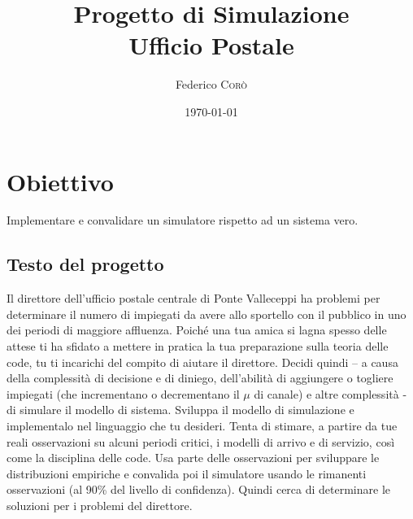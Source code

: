 \documentclass{article}
\title{Progetto di Simulazione \\ Ufficio Postale} %
\author{Federico \textsc{Corò}} %
\date{\today} %
\begin{document}
\maketitle %




\section{Obiettivo}

Implementare e convalidare un simulatore rispetto ad un sistema vero.

\subsection{Testo del progetto}
\label{definitions}
Il direttore dell’ufficio postale centrale di Ponte Valleceppi ha problemi per determinare il numero
di impiegati da avere allo sportello con il pubblico in uno dei periodi di maggiore affluenza.
Poiché una tua amica si lagna spesso delle attese ti ha sfidato a mettere in pratica la tua
preparazione sulla teoria delle code, tu ti incarichi del compito di aiutare il direttore.
Decidi quindi – a causa della complessità di decisione e di diniego, dell’abilità di aggiungere o
togliere impiegati (che incrementano o decrementano il $\mu$ di canale) e altre complessità - di
simulare il modello di sistema.
Sviluppa il modello di simulazione e implementalo nel linguaggio che tu desideri.
Tenta di stimare, a partire da tue reali osservazioni su alcuni periodi critici, i modelli di arrivo e di
servizio, così come la disciplina delle code.
Usa parte delle osservazioni per sviluppare le distribuzioni empiriche e convalida poi il simulatore
usando le rimanenti osservazioni (al 90\% del livello di confidenza).
Quindi cerca di determinare le soluzioni per i problemi del direttore.
 
\end{document}
